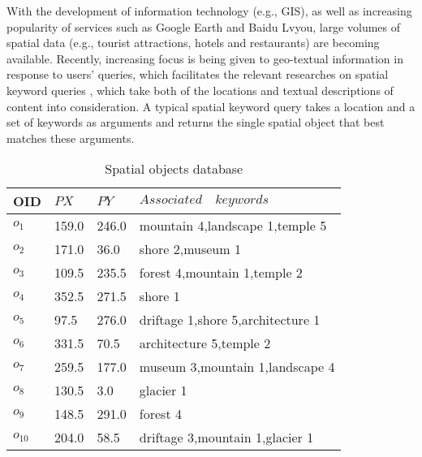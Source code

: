 With the development of information technology (e.g., GIS), as well as increasing popularity of services such as Google Earth and Baidu Lvyou, large volumes of spatial data (e.g., tourist attractions, hotels and restaurants) are becoming available. Recently, increasing focus is being given to geo-textual information in response to users' queries, which facilitates the relevant researches on spatial keyword queries \cite{cong2012efficient, de2008keyword, wu2012joint, zhang2009keyword}, which take both of the locations and textual descriptions of content into consideration. A typical spatial keyword query takes a location and a set of keywords as arguments and returns the single spatial object that best matches these arguments.
\begin{table}
\centering
\begin{tabular}{|l|l|l|l|}
\hline
OID & $PX$ & $PY$ & $Associated \quad keywords$ \\
\hline \hline
$o_1$ & 159.0 & 246.0 & mountain 4,landscape 1,temple 5 \\
\hline
$o_2$ & 171.0 & 36.0 & shore 2,museum 1 \\
\hline
$o_3$ & 109.5 & 235.5 & forest 4,mountain 1,temple 2 \\
\hline
$o_4$ & 352.5 & 271.5 & shore 1 \\
\hline
$o_5$ & 97.5 & 276.0 & driftage 1,shore 5,architecture 1 \\
\hline
$o_6$ & 331.5 & 70.5 & architecture 5,temple 2 \\
\hline
$o_7$ & 259.5 & 177.0 & museum 3,mountain 1,landscape 4 \\
\hline
$o_8$ & 130.5 & 3.0 & glacier 1 \\
\hline
$o_9$ & 148.5 & 291.0 & forest 4 \\
\hline
$o_{10}$ & 204.0 & 58.5 & driftage 3,mountain 1,glacier 1 \\
\hline
\end{tabular}
\caption{Spatial objects database}\label{T1}
\end{table}

